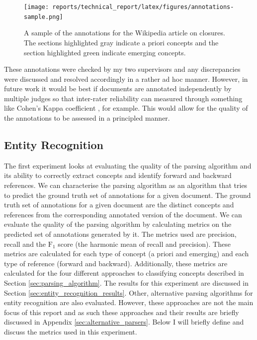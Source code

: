 \documentclass[12pt]{article}
\theoremstyle{grammarstyle}
\begin{document}
\begin{figure}
    \centering
    \texttt{[image: reports/technical\_report/latex/figures/annotations-sample.png]}
    \caption{A sample of the annotations for the Wikipedia article on closures. The sections highlighted gray indicate a priori concepts and the section highlighted green indicate emerging concepts.}
    \label{fig:annotatations_sample}
\end{figure}

These annotations were checked by my two supervisors and any discrepancies were discussed and resolved accordingly in a rather ad hoc manner.
However, in future work it would be best if documents are annotated independently by multiple judges so that inter-rater reliability can measured through something like Cohen's Kappa coefficient \citep{cohen1960coefficient, mchugh2012interrater}, for example. This would allow for the quality of the annotations to be assessed in a principled manner.

\subsection{Entity Recognition} \label{sec:entity_recognition}
The first experiment looks at evaluating the quality of the parsing algorithm and its ability to correctly extract concepts and identify forward and backward references.
We can characterise the parsing algorithm as an algorithm that tries to predict the ground truth set of annotations for a given document. The ground truth set of annotations for a given document are the distinct concepts and references from the corresponding annotated version of the document.
We can evaluate the quality of the parsing algorithm by calculating metrics on the predicted set of annotations generated by it. The metrics used are precision, recall and the $\text{F}_1$ score (the harmonic mean of recall and precision). These metrics are calculated for each type of concept (a priori and emerging) and each type of reference (forward and backward).
Additionally, these metrics are calculated for the four different approaches to classifying concepts described in Section \ref{sec:parsing_algorithm}.
The results for this experiment are discussed in Section \ref{sec:entity_recognition_results}.
Other, alternative parsing algorithms for entity recognition are also evaluated.
However, these approaches are not the main focus of this report and as such these approaches and their results are briefly discussed in Appendix \ref{sec:alternative_parsers}. Below I will briefly define and discuss the metrics used in this experiment.
\end{document}
